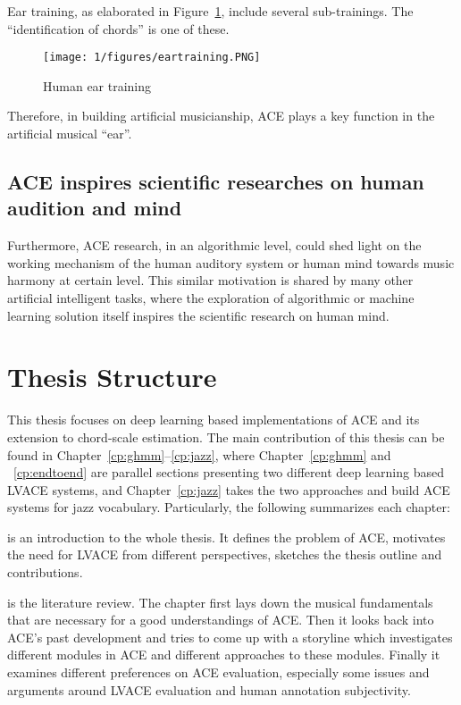Ear training, as elaborated in Figure~\ref{fig:1-eartraining}, include several sub-trainings. The ``identification of chords'' is one of these.
\begin{figure}
\centering
\texttt{[image: 1/figures/eartraining.PNG]}
\caption{Human ear training}
\label{fig:1-eartraining}
\end{figure}

Therefore, in building artificial musicianship, ACE plays a key function in the artificial musical ``ear''.

\subsection{ACE inspires scientific researches on human audition and mind}
Furthermore, ACE research, in an algorithmic level, could shed light on the working mechanism of the human auditory system or human mind towards music harmony at certain level. This similar motivation is shared by many other artificial intelligent tasks\cite{lecun1995convolutional,hinton1995wake}, where the exploration of algorithmic or machine learning solution itself inspires the scientific research on human mind.

\section{Thesis Structure} \label{sec:1-outline}
This thesis focuses on deep learning based implementations of ACE and its extension to chord-scale estimation. The main contribution of this thesis can be found in Chapter~\ref{cp:ghmm}--\ref{cp:jazz}, where Chapter~\ref{cp:ghmm} and ~\ref{cp:endtoend} are parallel sections presenting two different deep learning based LVACE systems, and Chapter~\ref{cp:jazz} takes the two approaches and build ACE systems for jazz vocabulary. Particularly, the following summarizes each chapter:

 is an introduction to the whole thesis. It defines the problem of ACE, motivates the need for LVACE from different perspectives, sketches the thesis outline and contributions.

 is the literature review. The chapter first lays down the musical fundamentals that are necessary for a good understandings of ACE. Then it looks back into ACE's past development and tries to come up with a storyline which investigates different modules in ACE and different approaches to these modules. Finally it examines different preferences on ACE evaluation, especially some issues and arguments around LVACE evaluation and human annotation subjectivity.

